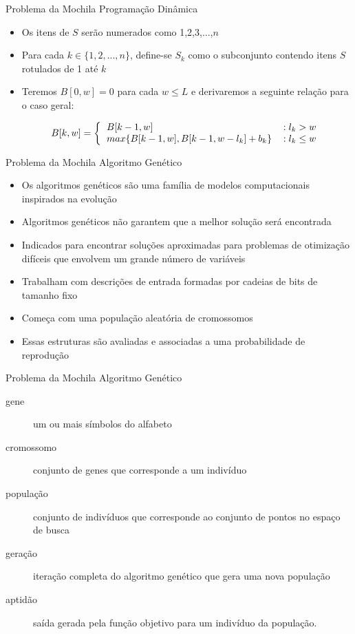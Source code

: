 \documentclass[slidestop,compress,mathserif]{beamer}
\begin{document}
\begin{frame} {Problema da Mochila} {Programação Dinâmica}

\begin{itemize}
\item Os itens de $S$ serão numerados como 1,2,3,...,$n$
\item Para cada $k \in \{1,2,...,n\}$, define-se $S_k$ como o subconjunto contendo itens $S$ rotulados de 1 até $k$
\item Teremos $B[0,w]=0$ para cada $w \leq L$ e derivaremos a seguinte relação para o caso geral:

\[ B[k,w]= \left \{ \begin{tabular}  {lc}
                                     $B[k-1,w]$ & $:l_k > w$ \\
                                     $max\{ B[k-1,w], B[k-1,w-l_k]+b_k\}$ & $:l_k \leq w$ \\
                                  \end{tabular} \right. \]
\end{itemize}
\end{frame}


\begin{frame} {Problema da Mochila} {Algoritmo Genético}

\begin{itemize}
 \item Os algoritmos genéticos são uma família de modelos computacionais inspirados na evolução
 \item Algoritmos genéticos não garantem que a melhor solução será encontrada
 \item Indicados para encontrar soluções aproximadas para problemas de otimização difíceis que envolvem um grande número de variáveis
 \item Trabalham com descrições de entrada formadas por cadeias de bits de tamanho fixo
 \item Começa com uma população aleatória de cromossomos
 \item Essas estruturas são avaliadas e associadas a uma probabilidade de reprodução
\end{itemize}

\end{frame}

\begin{frame} {Problema da Mochila} {Algoritmo Genético}

\begin{description}
	\item[gene] um ou mais símbolos do alfabeto
	\item[cromossomo] conjunto de genes que corresponde a um indivíduo
	\item[população] conjunto de indivíduos que corresponde ao conjunto de pontos no espaço de busca 
	\item[geração] iteração completa do algoritmo genético que gera uma nova população 
	\item[aptidão] saída gerada pela função objetivo para um indivíduo da população.
\end{description}

\end{frame}
\end{document}

